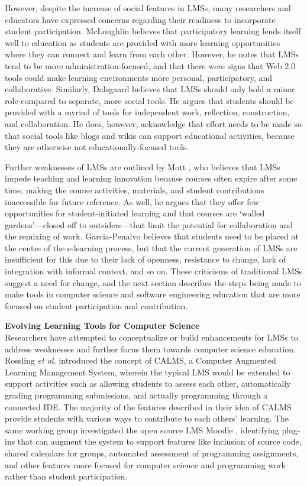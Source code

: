 However, despite the increase of social features in LMSs, many researchers and educators have expressed concerns regarding their readiness to incorporate student participation. McLoughlin \cite{mcloughlin2007social} believes that participatory learning lends itself well to education as students are provided with more learning opportunities where they can connect and learn from each other. However, he notes that LMSs tend to be more administration-focused, and that there were signs that Web 2.0 tools could make learning environments more personal, participatory, and collaborative. Similarly, Dalsgaard \cite{dalsgaard2006social} believes that LMSs should only hold a minor role compared to separate, more social tools. He argues that students should be provided with a myriad of tools for independent work, reflection, construction, and collaboration. He does, however, acknowledge that effort needs to be made so that social tools like blogs and wikis can support educational activities, because they are otherwise not educationally-focused tools.

Further weaknesses of LMSs are outlined by Mott \cite{mott2010envisioning}, who believes that LMSs impede teaching and learning innovation because courses often expire after some time, making the course activities, materials, and student contributions inaccessible for future reference. As well, he argues that they offer few opportunities for student-initiated learning and that courses are `walled gardens'---closed off to outsiders---that limit the potential for collaboration and the remixing of work. Garcia-Penalvo \cite{garcia2011opening} believes that students need to be placed at the centre of the e-learning process, but that the current generation of LMSs are insufficient for this due to their lack of openness, resistance to change, lack of integration with informal context, and so on. These criticisms of traditional LMSs suggest a need for change, and the next section describes the steps being made to make tools in computer science and software engineering education that are more focused on student participation and contribution.

\textbf{Evolving Learning Tools for Computer Science} \\
Researchers have attempted to conceptualize or build enhancements for LMSs to address weaknesses and further focus them towards computer science education. Rossling \textit{et al.} \cite{rossling2008enhancing} introduced the concept of CALMS, a Computer Augmented Learning Management System, wherein the typical LMS would be extended to support activities such as allowing students to assess each other, automatically grading programming submissions, and actually programming through a connected IDE. The majority of the features described in their idea of CALMS provide students with various ways to contribute to each others' learning. The same working group investigated the open source LMS Moodle \cite{rossling2010adapting}, identifying plug-ins that can augment the system to support features like inclusion of source code, shared calendars for groups, automated assessment of programming assignments, and other features more focused for computer science and programming work rather than student participation.

